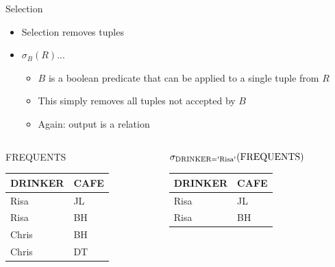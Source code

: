 \documentclass[aspectratio=169]{beamer}
\begin{document}
\begin{frame}{Selection}

\begin{itemize}
\item Selection removes tuples
\item $\sigma_B (R)$...
	\begin{itemize}
	\item $B$ is a boolean predicate that can be applied to a single tuple from $R$
	\item This simply removes all tuples not accepted by $B$
	\item Again: output is a relation
	\end{itemize}
\end{itemize}

\begin{columns}[t]
\begin{column}{0.5\textwidth}
FREQUENTS\\
\begin{tabular}{|l|l|}  \hline
\textrm{DRINKER} & \textrm{CAFE} \\ \hline
 Risa & JL \\ \hline
 Risa & BH \\ \hline
Chris & BH \\ \hline
Chris & DT \\ \hline %
\end{tabular}
\end{column}
\begin{column}{0.5\textwidth}
$\sigma_{\textrm{DRINKER=\textquotesingle{Risa}\textquotesingle}}(\textrm{FREQUENTS})$\\
\begin{tabular}{|l|l|}  \hline
\textrm{DRINKER} & \textrm{CAFE} \\ \hline
 Risa & JL \\ \hline
 Risa & BH \\ \hline
\end{tabular}
\end{column}
\end{columns}

\end{frame}
\end{document}
